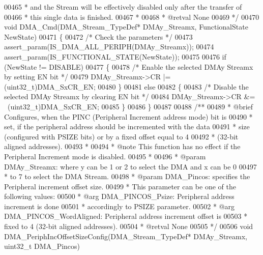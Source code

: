 \begin{DoxyCode}
00465 \textcolor{comment}{  *        and the Stream will be effectively disabled only after the transfer of}
00466 \textcolor{comment}{  *        this single data is finished.            }
00467 \textcolor{comment}{  *    }
00468 \textcolor{comment}{  * @retval None}
00469 \textcolor{comment}{  */}
00470 \textcolor{keywordtype}{void} DMA_Cmd(DMA\_Stream\_TypeDef* DMAy\_Streamx, FunctionalState NewState)
00471 \{
00472   \textcolor{comment}{/* Check the parameters */}
00473   assert_param(IS\_DMA\_ALL\_PERIPH(DMAy\_Streamx));
00474   assert_param(IS\_FUNCTIONAL\_STATE(NewState));
00475 
00476   \textcolor{keywordflow}{if} (NewState != DISABLE)
00477   \{
00478     \textcolor{comment}{/* Enable the selected DMAy Streamx by setting EN bit */}
00479     DMAy\_Streamx->CR |= (uint32\_t)DMA_SxCR_EN;
00480   \}
00481   \textcolor{keywordflow}{else}
00482   \{
00483     \textcolor{comment}{/* Disable the selected DMAy Streamx by clearing EN bit */}
00484     DMAy\_Streamx->CR &= ~(uint32\_t)DMA_SxCR_EN;
00485   \}
00486 \}
00487 
00488 \textcolor{comment}{/**}
00489 \textcolor{comment}{  * @brief  Configures, when the PINC (Peripheral Increment address mode) bit is}
00490 \textcolor{comment}{  *         set, if the peripheral address should be incremented with the data }
00491 \textcolor{comment}{  *         size (configured with PSIZE bits) or by a fixed offset equal to 4}
00492 \textcolor{comment}{  *         (32-bit aligned addresses).}
00493 \textcolor{comment}{  *   }
00494 \textcolor{comment}{  * @note   This function has no effect if the Peripheral Increment mode is disabled.}
00495 \textcolor{comment}{  *     }
00496 \textcolor{comment}{  * @param  DMAy\_Streamx: where y can be 1 or 2 to select the DMA and x can be 0}
00497 \textcolor{comment}{  *          to 7 to select the DMA Stream.}
00498 \textcolor{comment}{  * @param  DMA\_Pincos: specifies the Peripheral increment offset size.}
00499 \textcolor{comment}{  *          This parameter can be one of the following values:}
00500 \textcolor{comment}{  *            @arg DMA\_PINCOS\_Psize: Peripheral address increment is done  }
00501 \textcolor{comment}{  *                                   accordingly to PSIZE parameter.}
00502 \textcolor{comment}{  *            @arg DMA\_PINCOS\_WordAligned: Peripheral address increment offset is }
00503 \textcolor{comment}{  *                                         fixed to 4 (32-bit aligned addresses). }
00504 \textcolor{comment}{  * @retval None}
00505 \textcolor{comment}{  */}
00506 \textcolor{keywordtype}{void} DMA_PeriphIncOffsetSizeConfig(DMA\_Stream\_TypeDef* DMAy\_Streamx, uint32\_t DMA\_Pincos)

\end{DoxyCode}
